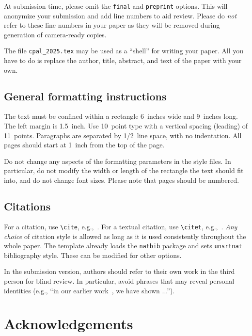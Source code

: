 \documentclass{article}
\begin{document}
At submission time, please omit the \verb+final+ and \verb+preprint+
options. This will anonymize your submission and add line numbers to aid
review. Please do \emph{not} refer to these line numbers in your paper as they
will be removed during generation of camera-ready copies.


The file \verb+cpal_2025.tex+ may be used as a ``shell'' for writing your
paper. All you have to do is replace the author, title, abstract, and text of
the paper with your own.

\subsection{General formatting instructions}
\label{gen_inst}


The text must be confined within a rectangle 6~inches wide and
9~inches long. The left margin is 1.5~inch.  Use 10~point
type with a vertical spacing (leading) of 11~points. 
Paragraphs are separated by 1/2~line space, with no
indentation. All pages should start at 1~inch  from the
top of the page.


Do not change any aspects of the formatting parameters in the style files.  In
particular, do not modify the width or length of the rectangle the text should
fit into, and do not change font sizes. Please note that pages should be
numbered.






\subsection{Citations}
\label{others}

For a citation, use \verb+\cite+, e.g.,~\cite{ma2022principles}.
For a textual citation, use \verb+\citet+, e.g.,~\citet{ma2022principles}.  \emph{Any choice} of citation style is allowed as long as it is used consistently throughout the whole paper. The template already loads the \verb+natbib+ package and sets \verb+unsrtnat+ bibliography style. These can be modified for other options.


In the submission version, authors should refer to their own work in the third person for blind review.
In particular, avoid phrases that may reveal personal identities (e.g., ``in our earlier work~\cite{ma2022principles}, we have shown ...''). 


\section*{Acknowledgements}
\end{document}
